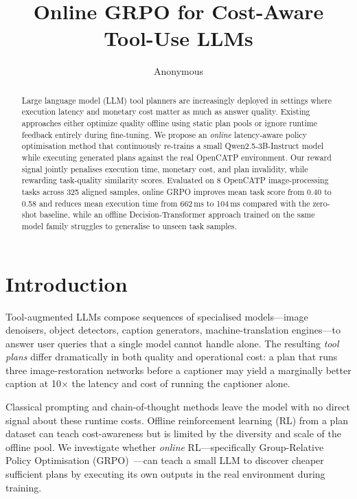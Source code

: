 \documentclass[10pt,twocolumn]{article}
\title{\textbf{Online GRPO for Cost-Aware Tool-Use LLMs}}
\author{Anonymous}
\date{}
\begin{document}
\maketitle

\begin{abstract}
Large language model (LLM) tool planners are increasingly deployed in settings
where execution latency and monetary cost matter as much as answer quality.
Existing approaches either optimize quality offline using static plan pools
or ignore runtime feedback entirely during fine-tuning.
We propose an \emph{online} latency-aware policy optimisation method that
continuously re-trains a small Qwen2.5-3B-Instruct model while executing
generated plans against the real OpenCATP environment.
Our reward signal jointly penalises execution time, monetary cost, and
plan invalidity, while rewarding task-quality similarity scores.
Evaluated on 8 OpenCATP image-processing tasks across 325 aligned samples,
online GRPO improves mean task score from 0.40 to 0.58 and reduces mean
execution time from 662\,ms to 104\,ms compared with the zero-shot baseline,
while an offline Decision-Transformer approach trained on the same model family
struggles to generalise to unseen task samples.
\end{abstract}


\section{Introduction}

Tool-augmented LLMs compose sequences of specialised models---image denoisers,
object detectors, caption generators, machine-translation engines---to answer
user queries that a single model cannot handle alone.
The resulting \emph{tool plans} differ dramatically in both quality and
operational cost: a plan that runs three image-restoration networks before a
captioner may yield a marginally better caption at 10$\times$ the latency
and cost of running the captioner alone.

Classical prompting and chain-of-thought methods leave the model with no
direct signal about these runtime costs.
Offline reinforcement learning (RL) from a plan dataset can teach
cost-awareness but is limited by the diversity and scale of the offline pool.
We investigate whether \emph{online} RL---specifically Group-Relative Policy
Optimisation (GRPO)~\cite{shao2024deepseekmath}---can teach a small LLM to
discover cheaper sufficient plans by executing its own outputs in the real
environment during training.
\end{document}
